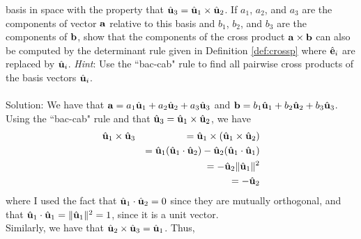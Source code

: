 \documentclass[12pt]{amsbook}
\begin{document}
basis in space with the property that 
$\hat{\bf u}_3=\hat{\bf u}_1\times\hat{\bf u}_2$.
If $a_1$, $a_2$, and $a_3$ are the components of 
vector ${\bf a}$ relative to this basis and 
$b_1$, $b_2$, and $b_3$ are the components of ${\bf b}$,
show that the components of the cross product
${\bf a}\times{\bf b}$ can also be computed by 
the determinant rule given in Definition \ref{def:crossp}
where $\hat{\bf e}_i$ are replaced by $\hat{\bf u}_i$.
{\it Hint}: Use the ``bac-cab" rule to find all pairwise cross 
products of the basis vectors $\hat{\bf u}_i$.\\
\\
{\sc Solution}:
We have that ${\bf a}=a_1\hat{\bf u}_1+a_2\hat{\bf u}_2+a_3\hat{\bf u}_3$ and ${\bf b}=b_1\hat{\bf u}_1+b_2\hat{\bf u}_2+b_3\hat{\bf u}_3$. Using the ``bac-cab" rule and that $\hat{\bf u}_3=\hat{\bf u}_1\times\hat{\bf u}_2$, we have
\begin{eqnarray*}
\hat{\bf u}_1\times\hat{\bf u}_3&&=\hat{\bf u}_1\times(\hat{\bf u}_1\times\hat{\bf u}_2)\\
&&=\hat{\bf u}_1(\hat{\bf u}_1\cdot\hat{\bf u}_2)-\hat{\bf u}_2(\hat{\bf u}_1\cdot\hat{\bf u}_1)\\
&&=-\hat{\bf u}_2\|\hat{\bf u}_1\|^2 \\
&&=-\hat{\bf u}_2
\end{eqnarray*}
where I used the fact that $\hat{\bf u}_1\cdot\hat{\bf u}_2=0$ since they are mutually orthogonal, and that $\hat{\bf u}_1\cdot\hat{\bf u}_1=\|\hat{\bf u}_1\|^2=1$, since it is a unit vector.
\\
Similarly, we have that $\hat{\bf u}_2\times\hat{\bf u}_3=\hat{\bf u}_1$. Thus,
\end{document}
